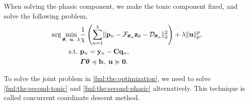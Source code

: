 \documentclass[10pt,conference]{ieeeconf}
\begin{document}
When solving the phasic component, we make the tonic component fixed, and solve the following problem,
\begin{subequations} \label{fml:the:second-phasic}
  \renewcommand{\theequation}
  {\theparentequation-\arabic{equation}}
  \begin{align}
  \arg \min\limits_{\boldsymbol{\theta},~\mathbf{u},~\lambda} & \frac{1}{\chi}  \left( \sum_{n=1}^{\chi} \lVert \mathbf{p}_n - \mathcal{F}_{\boldsymbol{\theta}_n} \mathbf{z}_{0} - \mathcal{D}_{\boldsymbol{\theta}_n} \rVert^2_2 \right) + \lambda \lVert \mathbf{u} \rVert_p^p, \\
  \mathrm{s.t.}~& \mathbf{p}_n = \mathbf{y}_n -  \mathbf{C} \mathbf{q}_n, \\
  & \boldsymbol{\Gamma} \boldsymbol{\theta} \preccurlyeq \mathbf{b},~ \mathbf{u} \succcurlyeq \mathbf{0}.
  \end{align}
\end{subequations}

To solve the joint problem in \eqref{fml:the:optimization}, we need to solve \eqref{fml:the:second-tonic} and \eqref{fml:the:second-phasic} alternatively. This technique is called concurrent coordinate descent method.
\end{document}
